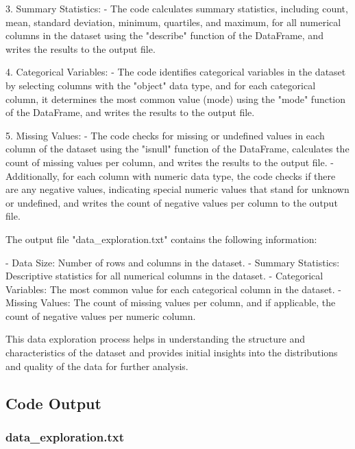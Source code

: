 \documentclass[11pt]{article}
\begin{document}
3. Summary Statistics:
   - The code calculates summary statistics, including count, mean, standard deviation, minimum, quartiles, and maximum, for all numerical columns in the dataset using the "describe" function of the DataFrame, and writes the results to the output file.

4. Categorical Variables:
   - The code identifies categorical variables in the dataset by selecting columns with the "object" data type, and for each categorical column, it determines the most common value (mode) using the "mode" function of the DataFrame, and writes the results to the output file.

5. Missing Values:
   - The code checks for missing or undefined values in each column of the dataset using the "isnull" function of the DataFrame, calculates the count of missing values per column, and writes the results to the output file.
   - Additionally, for each column with numeric data type, the code checks if there are any negative values, indicating special numeric values that stand for unknown or undefined, and writes the count of negative values per column to the output file.

The output file "data\_exploration.txt" contains the following information:

- Data Size: Number of rows and columns in the dataset.
- Summary Statistics: Descriptive statistics for all numerical columns in the dataset.
- Categorical Variables: The most common value for each categorical column in the dataset.
- Missing Values: The count of missing values per column, and if applicable, the count of negative values per numeric column.

This data exploration process helps in understanding the structure and characteristics of the dataset and provides initial insights into the distributions and quality of the data for further analysis.

\subsection{Code Output}

\subsubsection*{data\_exploration.txt}
\end{document}
